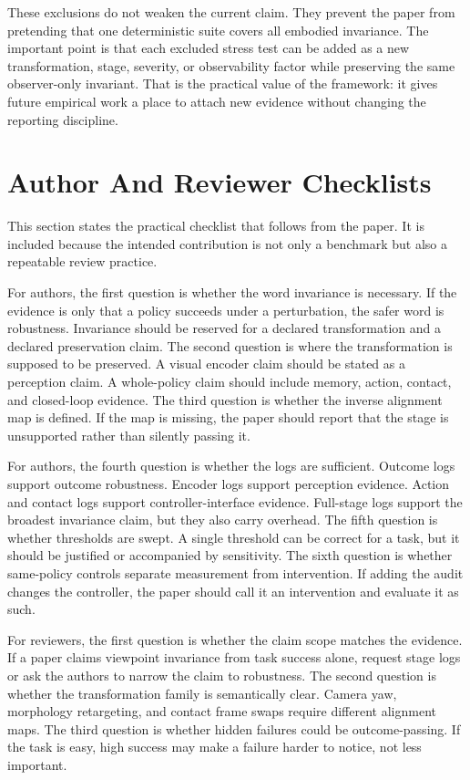 \documentclass{article}
\begin{document}
These exclusions do not weaken the current claim. They prevent the paper from pretending that one deterministic suite covers all embodied invariance. The important point is that each excluded stress test can be added as a new transformation, stage, severity, or observability factor while preserving the same observer-only invariant. That is the practical value of the framework: it gives future empirical work a place to attach new evidence without changing the reporting discipline.

\section{Author And Reviewer Checklists}

This section states the practical checklist that follows from the paper. It is included because the intended contribution is not only a benchmark but also a repeatable review practice.

For authors, the first question is whether the word invariance is necessary. If the evidence is only that a policy succeeds under a perturbation, the safer word is robustness. Invariance should be reserved for a declared transformation and a declared preservation claim. The second question is where the transformation is supposed to be preserved. A visual encoder claim should be stated as a perception claim. A whole-policy claim should include memory, action, contact, and closed-loop evidence. The third question is whether the inverse alignment map is defined. If the map is missing, the paper should report that the stage is unsupported rather than silently passing it.

For authors, the fourth question is whether the logs are sufficient. Outcome logs support outcome robustness. Encoder logs support perception evidence. Action and contact logs support controller-interface evidence. Full-stage logs support the broadest invariance claim, but they also carry overhead. The fifth question is whether thresholds are swept. A single threshold can be correct for a task, but it should be justified or accompanied by sensitivity. The sixth question is whether same-policy controls separate measurement from intervention. If adding the audit changes the controller, the paper should call it an intervention and evaluate it as such.

For reviewers, the first question is whether the claim scope matches the evidence. If a paper claims viewpoint invariance from task success alone, request stage logs or ask the authors to narrow the claim to robustness. The second question is whether the transformation family is semantically clear. Camera yaw, morphology retargeting, and contact frame swaps require different alignment maps. The third question is whether hidden failures could be outcome-passing. If the task is easy, high success may make a failure harder to notice, not less important.
\end{document}
